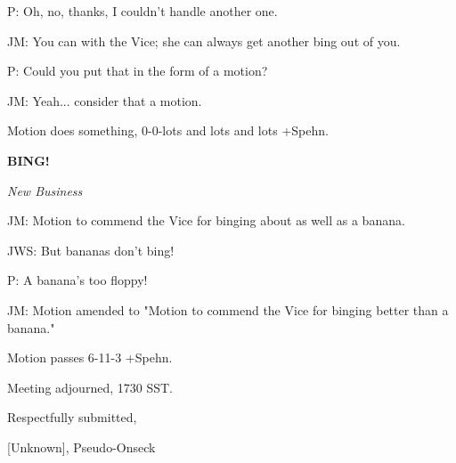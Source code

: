 \documentclass[12pt]{article}
\newcommand{\bing}{{\bf BING!} }
\newcommand{\goto}[1]{\bing \vskip 12pt \centerline{{\em{#1}}}}
\begin{document}
P: Oh, no, thanks, I couldn't handle another one.

JM: You can with the Vice; she can always get another bing out of you.

P: Could you put that in the form of a motion?

JM: Yeah... consider that a motion.

Motion does something, 0-0-lots and lots and lots +Spehn.

\goto{New Business}

JM: Motion to commend the Vice for binging about as well as a banana.

JWS: But bananas don't bing!

P: A banana's too floppy!

JM: Motion amended to "Motion to commend the Vice for binging better than a banana."

Motion passes 6-11-3 +Spehn.

\vspace{12pt}

\noindent
Meeting adjourned, 1730 SST.

\vspace{18pt}

\centerline{Respectfully submitted,}
\centerline{[Unknown], Pseudo-Onseck}
\end{document}
